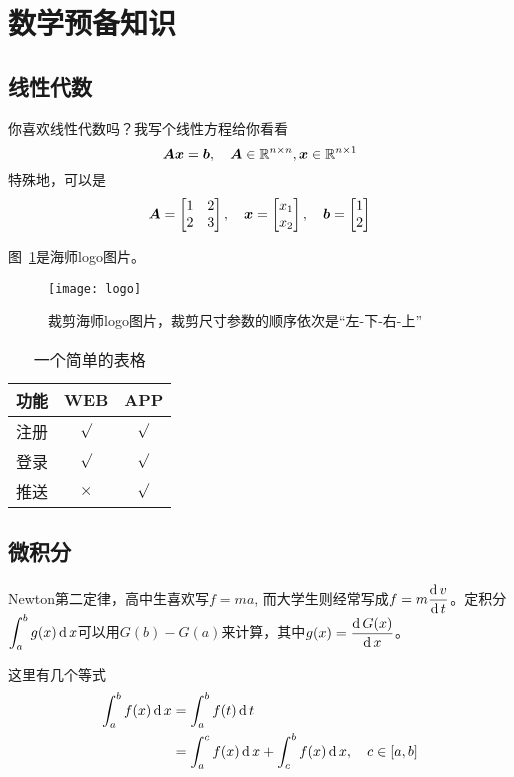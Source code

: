 \appendices
\section{数学预备知识}
\subsection{线性代数}
你喜欢线性代数吗？我写个线性方程给你看看
\begin{equation}
	\bm{A} \bm{x}= \bm{b}, \quad \bm{A}\in \mathbb{R}^{{n}\times {n}}, \bm{x}\in \mathbb{R}^{{n}\times {1}}
\end{equation}
特殊地，可以是
\begin{equation}
	\bm{A} = \begin{bmatrix}
		1 & 2 \\
		2 & 3 
	\end{bmatrix},\quad
	\bm{x}=\begin{bmatrix}
		x_1 \\ x_2
	\end{bmatrix}, \quad
	\bm{b} =\begin{bmatrix}
		1 \\ 2
	\end{bmatrix}
\end{equation}

图~\ref{hnulogo}是海师logo图片。
\begin{figure}[hp]
	\centering
	\texttt{[image: logo]}
	\caption{裁剪海师logo图片，裁剪尺寸参数的顺序依次是“左-下-右-上”}
	\label{hnulogo}
\end{figure}

\begin{table}[htp]
	\caption{一个简单的表格}\label{tab1}
	\centering
	\begin{tabular}{|l|c|c|}
		\hline
		功能          &WEB         &APP         \\ \hline
		注册          &$\surd$     &$\surd$     \\ \hline
		登录          &$\surd$     &$\surd$     \\ \hline
		推送          &$\times$    &$\surd$     \\ \hline
	\end{tabular}
\end{table}

\subsection{微积分}
Newton第二定律，高中生喜欢写$f=ma$, 而大学生则经常写成$\displaystyle{f=m\frac{\operatorname{\mathrm{d}}{v}}{\operatorname{\mathrm{d}}{t}}}$。定积分
$\displaystyle{\int^b_a g(x)\operatorname{\mathrm{d}}x}$可以用$G(b)-G(a)$来计算，其中$\displaystyle g(x) = \frac{\operatorname{\mathrm{d}} {G(x)}}{\operatorname{\mathrm{d}} {x}}$。

这里有几个等式
\begin{equation}
	\begin{split}
		\int^b_a f(x)\operatorname{\mathrm{d}} x 
		& = \int^b_a f(t)\operatorname{\mathrm{d}} t \\
		& = \int^c_a f(x)\operatorname{\mathrm{d}} x + \int^b_c f(x)\operatorname{\mathrm{d}} x, \quad c\in [a,b] 
	\end{split}
\end{equation}
